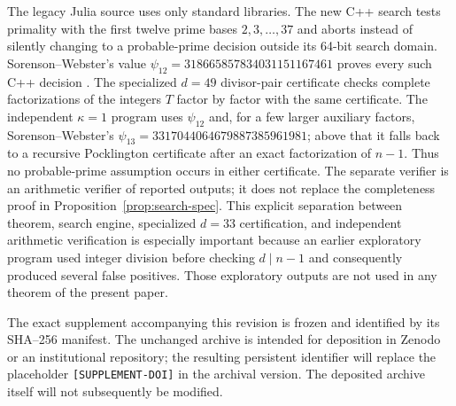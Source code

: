 \documentclass[11pt]{article}
\begin{document}
The legacy Julia source uses only standard libraries.  The new C++ search
tests primality with the first twelve prime bases $2,3,\ldots,37$ and aborts
instead of silently changing to a probable-prime decision outside its 64-bit
search domain.  Sorenson--Webster's value
$\psi_{12}=318665857834031151167461$ proves every such C++ decision
\cite{SorensonWebster2017}.  The specialized $d=49$ divisor-pair certificate
checks complete factorizations of the integers $T$ factor by factor with the
same certificate.  The independent $\kappa=1$ program uses $\psi_{12}$ and,
for a few larger auxiliary factors, Sorenson--Webster's
$\psi_{13}=3317044064679887385961981$; above that it falls back to a recursive
Pocklington certificate after an exact factorization of $n-1$.  Thus no
probable-prime assumption occurs in either certificate.  The separate verifier
is an arithmetic verifier of reported outputs; it does not replace the
completeness proof in Proposition~\ref{prop:search-spec}.  This explicit separation
between theorem, search engine, specialized $d=33$ certification, and
independent arithmetic verification is especially important because an earlier
exploratory program used integer division before checking $d\mid n-1$ and
consequently produced several false positives.  Those exploratory outputs are
not used in any theorem of the present paper.

The exact supplement accompanying this revision is frozen and identified by
its SHA--256 manifest.  The unchanged archive is intended for deposition in
Zenodo or an institutional repository; the resulting persistent identifier
will replace the placeholder \texttt{[SUPPLEMENT-DOI]} in the archival version.
The deposited archive itself will not subsequently be modified.
\end{document}
